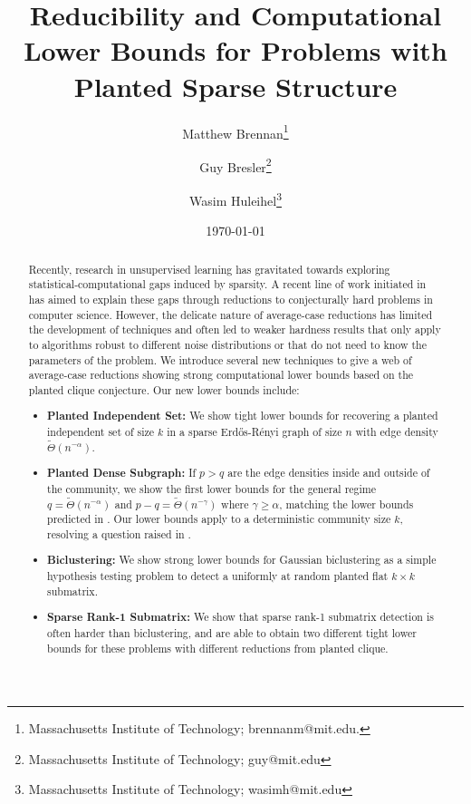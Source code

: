 \documentclass[11pt]{article}
\begin{document}
\title{Reducibility and Computational Lower Bounds for Problems with Planted Sparse Structure}

\author{Matthew Brennan\thanks{Massachusetts Institute of Technology; brennanm@mit.edu.}
\and 
Guy Bresler\thanks{Massachusetts Institute of Technology; guy@mit.edu}
\and
Wasim Huleihel\thanks{Massachusetts Institute of Technology; wasimh@mit.edu}}
\date{\today}

\maketitle

\begin{abstract}
Recently, research in unsupervised learning has gravitated towards exploring statistical-computational gaps induced by sparsity. A recent line of work initiated in \cite{berthet2013complexity} has aimed to explain these gaps through reductions to conjecturally hard problems in computer science. However, the delicate nature of average-case reductions has limited the development of techniques and often led to weaker hardness results that only apply to algorithms robust to different noise distributions or that do not need to know the parameters of the problem. We introduce several new techniques to give a web of average-case reductions showing strong computational lower bounds based on the planted clique conjecture. Our new lower bounds include:
\begin{itemize}
\item \textbf{Planted Independent Set:} We show tight lower bounds for recovering a planted independent set of size $k$ in a sparse Erd\H{o}s-R\'{e}nyi graph of size $n$ with edge density $\tilde{\Theta}(n^{-\alpha})$.
\item \textbf{Planted Dense Subgraph:} If $p > q$ are the edge densities inside and outside of the community, we show the first lower bounds for the general regime $q = \tilde{\Theta}(n^{-\alpha})$ and $p - q = \tilde{\Theta}(n^{-\gamma})$ where $\gamma \ge \alpha$, matching the lower bounds predicted in \cite{chen2016statistical}. Our lower bounds apply to a deterministic community size $k$, resolving a question raised in \cite{hajek2015computational}.
\item \textbf{Biclustering:} We show strong lower bounds for Gaussian biclustering as a simple hypothesis testing problem to detect a uniformly at random planted flat $k \times k$ submatrix.
\item \textbf{Sparse Rank-1 Submatrix:} We show that sparse rank-1 submatrix detection is often harder than biclustering, and are able to obtain two different tight lower bounds for these problems with different reductions from planted clique.

\end{itemize}
\end{abstract}
\end{document}
